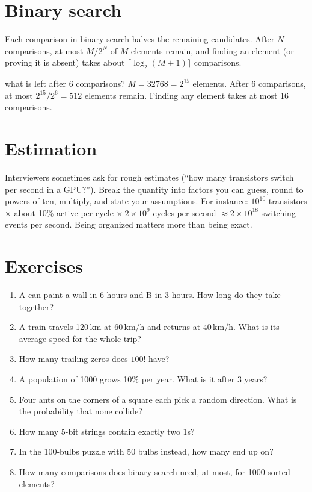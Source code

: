 \section{Binary search}

Each comparison in binary search halves the remaining candidates. After $N$ comparisons, at most $M/2^N$ of $M$ elements remain, and finding an element (or proving it is absent) takes about $\lceil \log_2(M+1) \rceil$ comparisons.

\begin{worked}{what is left after 6 comparisons?}
$M = 32768 = 2^{15}$ elements. After 6 comparisons, at most $2^{15}/2^6 = 512$ elements remain. Finding any element takes at most 16 comparisons.
\end{worked}

\section{Estimation}

Interviewers sometimes ask for rough estimates (``how many transistors switch per second in a GPU?''). Break the quantity into factors you can guess, round to powers of ten, multiply, and state your assumptions. For instance: $10^{10}$ transistors $\times$ about 10\% active per cycle $\times\ 2\times10^9$ cycles per second $\approx 2\times10^{18}$ switching events per second. Being organized matters more than being exact.

\section{Exercises}

\begin{enumerate}
  \item A can paint a wall in 6 hours and B in 3 hours. How long do they take together?
  \item A train travels 120\,km at 60\,km/h and returns at 40\,km/h. What is its average speed for the whole trip?
  \item How many trailing zeros does $100!$ have?
  \item A population of 1000 grows 10\% per year. What is it after 3 years?
  \item Four ants on the corners of a square each pick a random direction. What is the probability that none collide?
  \item How many 5-bit strings contain exactly two 1s?
  \item In the 100-bulbs puzzle with 50 bulbs instead, how many end up on?
  \item How many comparisons does binary search need, at most, for 1000 sorted elements?
\end{enumerate}

